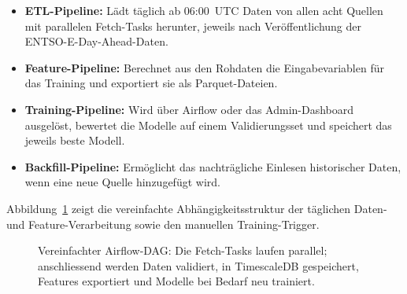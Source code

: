 \documentclass[sigconf]{acmart}
\begin{document}
\begin{itemize}
  \item \textbf{ETL-Pipeline:} L\"adt t\"aglich ab 06:00~UTC Daten von allen
        acht Quellen mit parallelen Fetch-Tasks herunter,
        jeweils nach Ver\"offentlichung der ENTSO-E-Day-Ahead-Daten.
  \item \textbf{Feature-Pipeline:} Berechnet aus den Rohdaten die Eingabe\-variablen
        f\"ur das Training und exportiert sie als Parquet-Dateien.
  \item \textbf{Training-Pipeline:} Wird \"uber Airflow oder das Admin-Dashboard
        ausgel\"ost, bewertet die Modelle auf einem Validierungsset und speichert
        das jeweils beste Modell.
  \item \textbf{Backfill-Pipeline:} Erm\"oglicht das nachtr\"agliche Einlesen
        historischer Daten, wenn eine neue Quelle hinzugef\"ugt wird.
\end{itemize}

Abbildung~\ref{fig:dag} zeigt die vereinfachte Abh\"angigkeitsstruktur der
t\"aglichen Daten- und Feature-Verarbeitung sowie den manuellen Training-Trigger.

\begin{figure}[htb]
  \centering
  \caption{Vereinfachter Airflow-DAG: Die Fetch-Tasks laufen parallel;
           anschliessend werden Daten validiert, in TimescaleDB gespeichert,
           Features exportiert und Modelle bei Bedarf neu trainiert.}
  \label{fig:dag}
\end{figure}
\end{document}

